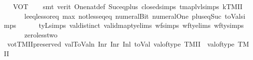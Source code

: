 \begin{isabellebody}
\isadelimproof
\ %
\endisadelimproof
%
\isatagproof
{}\isamarkupfalse%
\ VOT\isanewline
\ \ \isamarkupfalse%
\ {\isacharparenleft}{\kern0pt}smt\ {\isacharparenleft}{\kern0pt}verit{\isacharparenright}{\kern0pt}\ One{\isacharunderscore}{\kern0pt}nat{\isacharunderscore}{\kern0pt}def\ Suc{\isacharunderscore}{\kern0pt}eq{\isacharunderscore}{\kern0pt}plus{}\ closed{\isachardot}{\kern0pt}simps{\isacharparenleft}{\kern0pt}{}{\isacharcomma}{\kern0pt}{}{\isacharparenright}{\kern0pt}\ tmap{\isacharunderscore}{\kern0pt}lvl{\isachardot}{\kern0pt}simps{\isacharparenleft}{\kern0pt}{}{\isacharcomma}{\kern0pt}{}{\isacharparenright}{\kern0pt}\ kTMII\isanewline
\ \ \ \ \ \ le{\isacharunderscore}{\kern0pt}eq{\isacharunderscore}{\kern0pt}less{\isacharunderscore}{\kern0pt}or{\isacharunderscore}{\kern0pt}eq\ max{\isacharunderscore}{\kern0pt}{}{\isacharunderscore}{\kern0pt}{}{\isacharparenleft}{\kern0pt}{}{\isacharparenright}{\kern0pt}\ not{\isacharunderscore}{\kern0pt}less{\isacharunderscore}{\kern0pt}eq{\isacharunderscore}{\kern0pt}eq\ numeral{\isacharunderscore}{\kern0pt}Bit{}\ numeral{\isacharunderscore}{\kern0pt}One\ plus{\isacharunderscore}{\kern0pt}{}{\isacharunderscore}{\kern0pt}eq{\isacharunderscore}{\kern0pt}Suc\ toVal{}{\isachardot}{\kern0pt}simps{\isacharparenleft}{\kern0pt}{}{\isacharparenright}{\kern0pt}\isanewline
\ \ \ \ \ \ tyL{\isachardot}{\kern0pt}simps\ val{\isachardot}{\kern0pt}distinct{\isacharparenleft}{\kern0pt}{}{\isacharparenright}{\kern0pt}\ valid{\isacharunderscore}{\kern0pt}mapty{\isachardot}{\kern0pt}elims{\isacharparenleft}{\kern0pt}{}{\isacharparenright}{\kern0pt}\ wf{\isachardot}{\kern0pt}simps\ wf{\isacharunderscore}{\kern0pt}ty{\isachardot}{\kern0pt}elims{\isacharparenleft}{\kern0pt}{}{\isacharparenright}{\kern0pt}\ wf{\isacharunderscore}{\kern0pt}ty{\isachardot}{\kern0pt}simps{\isacharparenleft}{\kern0pt}{}{\isacharparenright}{\kern0pt}\isanewline
\ \ \ \ \ \ zero{\isacharunderscore}{\kern0pt}less{\isacharunderscore}{\kern0pt}two{\isacharparenright}{\kern0pt}%
\endisatagproof
{\isafoldproof}%
%
\isadelimproof
%
\endisadelimproof
\isanewline
\isanewline
\isanewline
{}\isamarkupfalse%
\ votTMIIpreserved{\isacharcolon}{\kern0pt}\ {\isachardoublequoteopen}val{}ToValn\ {\isacharparenleft}{\kern0pt}Inr\ {\isacharparenleft}{\kern0pt}Inr\ {\isacharparenleft}{\kern0pt}Inl\ {\isacharparenleft}{\kern0pt}toVal{}\ {\isacharparenleft}{\kern0pt}val{\isacharunderscore}{\kern0pt}of{\isacharunderscore}{\kern0pt}type\ {\isacharparenleft}{\kern0pt}TMII{\isacharparenright}{\kern0pt}{\isacharparenright}{\kern0pt}{\isacharparenright}{\kern0pt}{\isacharparenright}{\kern0pt}{\isacharparenright}{\kern0pt}{\isacharparenright}{\kern0pt}\ {\isacharequal}{\kern0pt}\ {\isacharparenleft}{\kern0pt}val{\isacharunderscore}{\kern0pt}of{\isacharunderscore}{\kern0pt}type\ {\isacharparenleft}{\kern0pt}TMII{\isacharparenright}{\kern0pt}{\isacharparenright}{\kern0pt}{\isachardoublequoteclose}\isanewline

\end{isabellebody}
